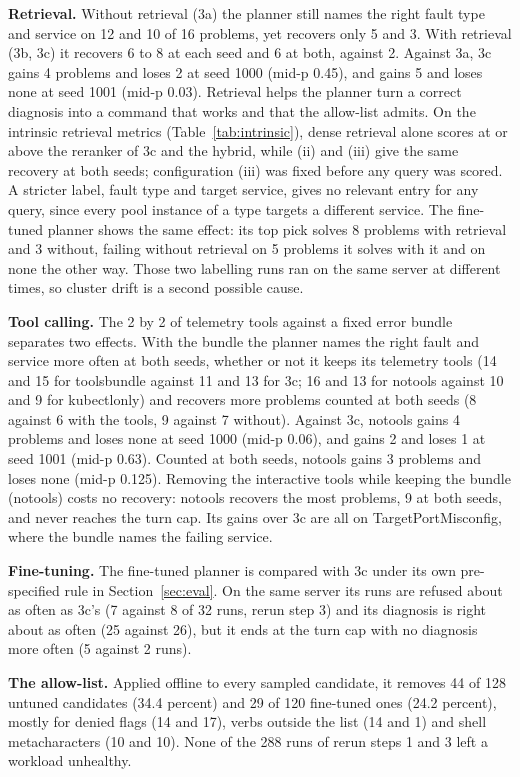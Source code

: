 \documentclass[10pt,conference]{IEEEtran}
\begin{document}
\textbf{Retrieval.} Without retrieval (3a) the planner still names the right fault type and
service on 12 and 10 of 16 problems, yet recovers only 5 and 3. With retrieval (3b, 3c) it
recovers 6 to 8 at each seed and 6 at both, against 2. Against 3a, 3c gains 4 problems and loses
2 at seed 1000 (mid-p 0.45), and gains 5 and loses none at seed 1001 (mid-p 0.03). Retrieval helps
the planner turn a correct diagnosis into a command that works and that the allow-list admits. On
the intrinsic retrieval metrics (Table~\ref{tab:intrinsic}), dense retrieval alone scores at or
above the reranker of 3c and the hybrid, while (ii) and (iii) give the same recovery at both seeds;
configuration (iii) was fixed before any query was scored. A stricter label, fault type and target
service, gives no relevant entry for any query, since every pool instance of a type targets a
different service. The
fine-tuned planner shows the same effect: its top pick solves 8 problems with retrieval and 3
without, failing without retrieval on 5 problems it solves with it and on none the other way.
Those two labelling runs ran on the same server at different times, so cluster drift is a second
possible cause.

\textbf{Tool calling.} The 2 by 2 of telemetry tools against a fixed error bundle separates two
effects. With the bundle the planner names the right fault and service more often at both seeds,
whether or not it keeps its telemetry tools (14 and 15 for toolsbundle against 11 and 13 for 3c; 16 and
13 for notools against 10 and 9 for kubectlonly) and recovers more problems counted at both seeds (8 against 6 with the tools, 9 against 7 without). Against
3c, notools gains 4 problems and loses none at seed 1000 (mid-p 0.06), and gains 2 and loses 1 at
seed 1001 (mid-p 0.63). Counted at both seeds, notools gains 3 problems and loses none (mid-p
0.125). Removing the interactive tools while keeping the bundle (notools) costs
no recovery: notools recovers the most problems, 9 at both seeds, and never reaches the turn cap. Its
gains over 3c are all on TargetPortMisconfig, where the bundle names the failing service.

\textbf{Fine-tuning.} The fine-tuned planner is compared with 3c under its own pre-specified rule
in Section~\ref{sec:eval}. On the same server its runs are refused about as often as 3c's (7
against 8 of 32 runs, rerun step 3) and its diagnosis is right about as often (25 against 26), but
it ends at the turn cap with no diagnosis more often (5 against 2 runs).

\textbf{The allow-list.} Applied offline to every sampled candidate, it removes 44 of 128 untuned
candidates (34.4 percent) and 29 of 120 fine-tuned ones (24.2 percent),
mostly for denied flags (14 and 17), verbs outside the list (14 and 1) and shell metacharacters
(10 and 10). None of the 288 runs of rerun
steps 1 and 3 left a workload unhealthy.
\end{document}
